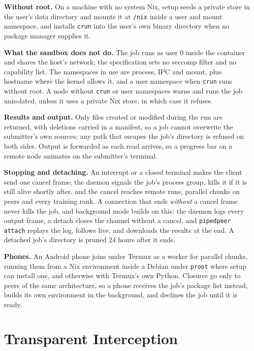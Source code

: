 \textbf{Without root.} On a machine with no system Nix, setup seeds a private
store in the user's data directory and mounts it at \texttt{/nix} inside a user
and mount namespace, and installs \texttt{crun} into the user's own binary
directory when no package manager supplies it.

\textbf{What the sandbox does not do.} The job runs as user 0 inside the
container and shares the host's network; the specification sets no seccomp
filter and no capability list. The namespaces in use are process, IPC and mount,
plus hostname where the kernel allows it, and a user namespace when \texttt{crun}
runs without root. A node without \texttt{crun} or user namespaces warns and runs
the job unisolated, unless it uses a private Nix store, in which case it refuses.

\textbf{Results and output.} Only files created or modified during the run are
returned, with deletions carried in a manifest, so a job cannot overwrite the
submitter's own sources; any path that escapes the job's directory is refused on
both sides. Output is forwarded as each read arrives, so a
progress bar on a remote node animates on the submitter's terminal.

\textbf{Stopping and detaching.} An interrupt or a closed terminal makes the
client send one cancel frame; the daemon signals the job's process group, kills
it if it is still alive shortly after, and the cancel reaches remote runs,
parallel chunks on peers and every training rank. A connection that ends
\emph{without} a cancel frame never kills the job, and background mode builds on
this: the daemon logs every output frame, a detach closes the channel without a
cancel, and \texttt{pipedpeer attach} replays the log, follows live, and
downloads the results at the end. A detached job's directory is pruned 24 hours
after it ends.

\textbf{Phones.} An Android phone joins under Termux \cite{termux} as a worker for
parallel chunks, running them from a Nix environment inside a Debian under
\texttt{proot} \cite{proot} where setup can install one, and otherwise with
Termux's own Python. Closures go only to peers of the same architecture, so a
phone receives the job's package list instead, builds its own environment in the
background, and declines the job until it is ready.

\section{Transparent Interception}
\label{sec:intercept}

